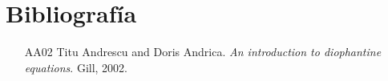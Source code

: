 \section{\large Bibliografía}

\small 
\begin{enumerate}

	\item[\lbrack AA02\rbrack] Titu Andrescu and Doris Andrica. \textit{An introduction to diophantine equations}. Gill, 2002.

\end{enumerate}